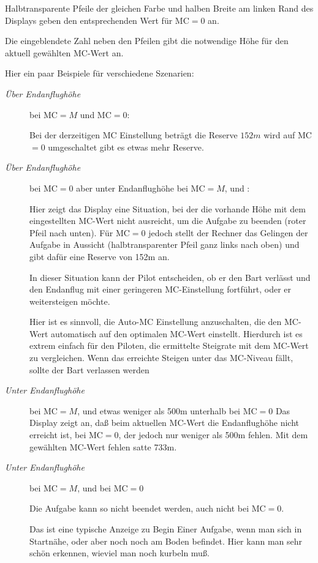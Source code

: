 Halbtransparente Pfeile der gleichen Farbe und halben Breite am linken Rand des Displays geben den entsprechenden Wert für MC$=0$ an.

Die eingeblendete Zahl neben den Pfeilen gibt die notwendige Höhe für den aktuell gewählten  MC-Wert an.

Hier ein paar Beispiele für verschiedene Szenarien:

\begin{description}
\item[\textit{Über Endanflughöhe}] bei  MC$=M$ und MC$=0$:

Bei der derzeitigen MC Einstellung beträgt die Reserve $152m$ wird auf MC$=0$ umgeschaltet gibt es etwas mehr Reserve.

\item[\textit{Über Endanflughöhe}] bei MC$=0$ aber unter Endanflughöhe bei  MC$=M$, und :

Hier zeigt  das Display eine Situation, bei der die vorhande Höhe  mit dem eingestellten MC-Wert nicht ausreicht,
um die Aufgabe zu beenden (roter Pfeil nach unten). Für MC$=0$ jedoch stellt der Rechner das Gelingen
der Aufgabe in Aussicht (halbtransparenter  Pfeil ganz links nach oben) und gibt dafür eine Reserve von 152m an.

In dieser Situation kann der Pilot entscheiden, ob er den Bart verlässt und den Endanflug
mit einer geringeren MC-Einstellung fortführt, oder er weitersteigen möchte.

Hier ist es sinnvoll, die Auto-MC Einstellung anzuschalten, die den MC-Wert automatisch auf den
optimalen MC-Wert einstellt. Hierdurch ist es extrem einfach für den Piloten, die ermittelte Steigrate
mit dem MC-Wert zu vergleichen. Wenn das erreichte Steigen unter das MC-Niveau fällt,
sollte der Bart verlassen werden

\item[\textit{Unter Endanflughöhe}]   bei MC$=M$, und etwas weniger als 500m  unterhalb bei MC$=0$
Das Display zeigt an, daß beim aktuellen MC-Wert die Endanflughöhe nicht erreicht ist,
bei MC$=0$, der jedoch nur weniger als 500m fehlen.
Mit dem gewählten MC-Wert fehlen satte 733m.
\item[\textit{Unter Endanflughöhe}]  bei  MC$=M$, und bei MC$=0$

Die Aufgabe kann so nicht beendet werden, auch nicht bei MC$=0$.

\vspace{2em}
Das ist eine typische Anzeige zu Begin Einer Aufgabe, wenn man sich in Startnähe, oder aber noch noch am Boden befindet.  
Hier kann man sehr schön erkennen, wieviel man noch kurbeln muß.
\end{description}


